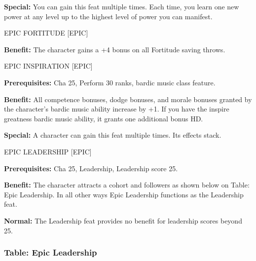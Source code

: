 \documentclass{article}
\begin{document}
\textbf{Special:} You can gain this feat multiple times. Each time, you learn one 
new power at any level up to the highest level of power you can manifest.

\vspace{12pt}
EPIC FORTITUDE\textit{\textbf{ }}[EPIC]\textit{ }

\textbf{Benefit:} The character gains a +4 bonus on all Fortitude saving throws. 

\vspace{12pt}
EPIC INSPIRATION [EPIC] 

\textbf{Prerequisites:} Cha 25, Perform 30 ranks, bardic music class feature. 

\textbf{Benefit:} All competence bonuses, dodge bonuses, and morale bonuses granted 
by the character's bardic music ability increase by +1.  If you have the inspire 
greatness bardic music ability, it grants one additional bonus HD. 

\textbf{Special:} A character can gain this feat multiple times. Its effects stack. 

\vspace{12pt}
EPIC LEADERSHIP [EPIC] 

\textbf{Prerequisites:} Cha 25, Leadership, Leadership score 25. 

\textbf{Benefit:} The character attracts a cohort and followers as shown below 
on Table: Epic Leadership.  In all other ways Epic Leadership functions as the 
Leadership feat.

\textbf{Normal:} The Leadership feat provides no benefit for leadership scores 
beyond 25.

\vspace{12pt}
\subsubsection*{\textbf{Table: Epic Leadership}}
\end{document}
